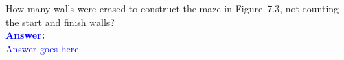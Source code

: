 \item{}
How many walls were erased to construct the maze in Figure~$7.3$, not counting
the start and finish walls?\\[12pt]
\ifanswers
\textcolor{blue}{
\textbf{Answer:}\\[6pt]
Answer goes here
}
\newpage
\fi

